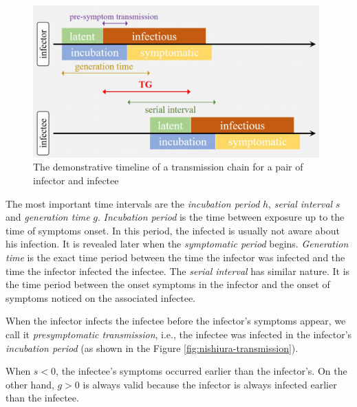 \documentclass[
  digital, %
  oneside, %
  lof,     %
  lot,     %
]{fithesis4}
\begin{document}
\begin{figure}[H]
  \begin{center}
    \includegraphics[width=11cm]{static/images/zhao2020_terms.png}
  \end{center}
  \caption{The demonstrative timeline of a transmission chain for a pair of infector and infectee \cite{zhao2020}}
  \label{fig:zhao-transmissive-chain-example}
\end{figure}

The most important time intervals are 
the \textit{incubation period} $h$, \textit{serial interval} $s$ and \textit{generation time} $g$.
\textit{Incubation period} is the time between exposure up to the time of symptoms onset.
In this period, the infected is usually not aware about his infection.
It is revealed later when the \textit{symptomatic period} begins.
\textit{Generation time} is the exact time period between the time the infector was infected and the time the infector infected the infectee.
The \textit{serial interval} has similar nature.
It is the time period between the onset symptoms in the infector and the onset of symptoms noticed on the associated infectee.

When the infector infects the infectee before the infector's
symptoms appear, we call it \textit{presymptomatic transmission}, i.e.,
the infectee was infected in the infector's \textit{incubation period}
(as shown in the Figure \ref{fig:nishiura-transmission}).

When $s < 0$, the infectee's symptoms occurred earlier than the infector's.
On the other hand, $g > 0$ is always
valid because the infector is always infected earlier than the infectee.
\end{document}
